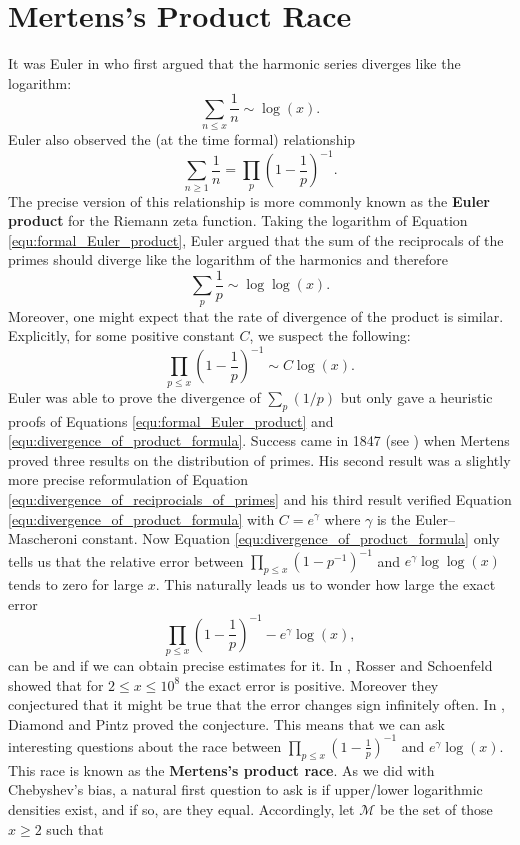 \documentclass[12pt,reqno]{amsart}
\theoremstyle{definition}
\numberwithin{equation}{section}
\begin{document}
\section{Mertens's Product Race}
    It was Euler in \cite{E} who first argued that the harmonic series diverges like the logarithm:
    \[
        \sum_{n \le x}\frac{1}{n} \sim \log(x).
    \]
    Euler also observed the (at the time formal) relationship
    \begin{equation}\label{equ:formal_Euler_product}
      \sum_{n \ge 1}\frac{1}{n} = \prod_{p}\left(1-\frac{1}{p}\right)^{-1}. 
    \end{equation}
    The precise version of this relationship is more commonly known as the \textbf{Euler product} for the Riemann zeta function. Taking the logarithm of Equation \ref{equ:formal_Euler_product}, Euler argued that the sum of the reciprocals of the primes should diverge like the logarithm of the harmonics and therefore
    \begin{equation}\label{equ:divergence_of_reciprocials_of_primes}
        \sum_{p}\frac{1}{p} \sim \log\log(x).
    \end{equation}
    Moreover, one might expect that the rate of divergence of the product is similar. Explicitly, for some positive constant $C$, we suspect the following:
    \begin{equation}\label{equ:divergence_of_product_formula}
        \prod_{p \le x}\left(1-\frac{1}{p}\right)^{-1} \sim C\log(x).
    \end{equation}
    Euler was able to prove the divergence of $\sum_{p}(1/p)$ but only gave a heuristic proofs of Equations \ref{equ:formal_Euler_product} and \ref{equ:divergence_of_product_formula}. Success came in 1847 (see \cite{M}) when Mertens proved three results on the distribution of primes. His second result was a slightly more precise reformulation of Equation \ref{equ:divergence_of_reciprocials_of_primes} and his third result verified Equation \ref{equ:divergence_of_product_formula} with $C = e^{\gamma}$ where $\gamma$ is the Euler--Mascheroni constant. Now Equation \ref{equ:divergence_of_product_formula} only tells us that the relative error between $\prod_{p \le x}(1-p^{-1})^{-1}$ and $e^{\gamma}\log\log(x)$ tends to zero for large $x$. This naturally leads us to wonder how large the exact error
    \[
        \prod_{p \le x}\left(1-\frac{1}{p}\right)^{-1}-e^{\gamma}\log(x),
    \]
    can be and if we can obtain precise estimates for it. In \cite{RoS}, Rosser and Schoenfeld showed that for $2 \le x \le 10^{8}$ the exact error is positive. Moreover they conjectured that it might be true that the error changes sign infinitely often. In \cite{DP}, Diamond and Pintz proved the conjecture. This means that we can ask interesting questions about the race between $\prod_{p \le x}\left(1-\frac{1}{p}\right)^{-1}$ and $e^{\gamma}\log(x)$. This race is known as the \textbf{Mertens's product race}. As we did with Chebyshev's bias, a natural first question to ask is if upper/lower logarithmic densities exist, and if so, are they equal. Accordingly, let $\mathcal{M}$ be the set of those $x \ge 2$ such that
\end{document}
